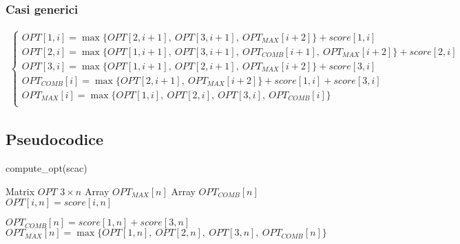 \subsubsection*{Casi generici}

\begin{align*}
    \begin{cases}
        OPT[1, i] = \max\{OPT[2, i + 1],\ OPT[3, i + 1],\ OPT_{MAX}[i + 2]\} + score[1, i] \\
        OPT[2, i] = \max\{OPT[1, i + 1],\ OPT[3, i + 1],\ OPT_{COMB}[i + 1],\ OPT_{MAX}[i + 2]\} + score[2, i] \\
        OPT[3, i] = \max\{OPT[1, i + 1],\ OPT[2, i + 1],\ OPT_{MAX}[i + 2]\} + score[3, i] \\
        OPT_{COMB}[i] = \max\{OPT[2, i + 1],\ OPT_{MAX}[i + 2]\} + score[1, i] + score[3, i] \\
        OPT_{MAX}[i] = \max\{OPT[1, i],\ OPT[2, i],\ OPT[3, i],\ OPT_{COMB}[i]\} \\
    \end{cases}
\end{align*}

\subsection{Pseudocodice}

\begin{algorithm}
    \caption{compute\_opt(scac)}
    \begin{algorithmic}[1]
        \State Matrix $OPT$ $3 \times n$
        \State Array $OPT_{MAX}[n]$
        \State Array $OPT_{COMB}[n]$ 
        \State {}
            \State $OPT[i, n] = score[i, n]$
        \EndFor

        \State $OPT_{COMB}[n] = score[1,n] + score[3,n]$
        \State $OPT_{MAX}[n] = \max\{OPT[1,n],\ OPT[2,n],\ OPT[3,n],\ OPT_{COMB}[n]\}$
        \State {}


    \EndFunction
    \end{algorithmic}
\end{algorithm}
